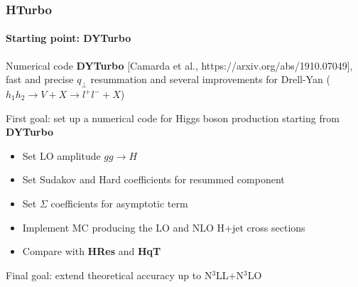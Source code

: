 \documentclass[aspectratio=43]{beamer}
\begin{document}
\begin{frame}

	\frametitle{HTurbo}
	\framesubtitle{Starting point: DYTurbo}

	\footnotesize
	
	Numerical code \textbf{DYTurbo} {\color{blue}[Camarda et al., https://arxiv.org/abs/1910.07049]}, \\ fast and precise $q_{\perp}$ resummation and several improvements for Drell-Yan ($h_{1}h_{2} \rightarrow V + X \rightarrow l^{+}l^{-} + X$) 
	
	\vspace{0.5 cm}
	
	{\color{red}First goal}: set up a numerical code for Higgs boson production starting from  \textbf{DYTurbo}
 
	\begin{itemize}
		\item Set LO amplitude $gg \rightarrow H$
		\item Set Sudakov and Hard coefficients for resummed component
		\item Set $\Sigma$ coefficients for asymptotic term
		\item Implement MC producing the LO and NLO H+jet cross sections
		\item Compare with \textbf{HRes} and \textbf{HqT}
	\end{itemize}

	\vspace{0.2 cm}

	{\color{red}Final goal}: extend theoretical accuracy up to N$^{3}$LL+N$^{3}$LO

\end{frame}
\end{document}
